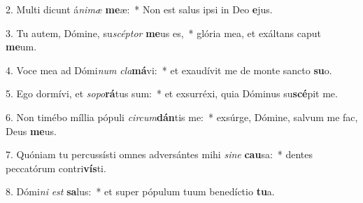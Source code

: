 2. Multi dicunt á\textit{ni}\textit{mæ} \textbf{me}æ:~*  Non est salus ipsi in Deo \textbf{e}jus.\

3. Tu autem, Dómine, su\textit{scép}\textit{tor} \textbf{me}us es,~*  glória mea, et exáltans caput \textbf{me}um.\

4. Voce mea ad Dómi\textit{num} \textit{cla}\textbf{má}vi:~*  et exaudívit me de monte sancto \textbf{su}o.\

5. Ego dormívi, et \textit{so}\textit{po}\textbf{rá}tus sum:~*  et exsurréxi, quia Dóminus su\textbf{scé}pit me.\

6. Non timébo míllia pópuli \textit{cir}\textit{cum}\textbf{dán}tis me:~*  exsúrge, Dómine, salvum me fac, Deus \textbf{me}us.\

7. Quóniam tu percussísti omnes adversántes mihi \textit{si}\textit{ne} \textbf{cau}sa:~*  dentes peccatórum contri\textbf{vís}ti.\

8. Dómi\textit{ni} \textit{est} \textbf{sa}lus:~*  et super pópulum tuum benedíctio \textbf{tu}a.\


